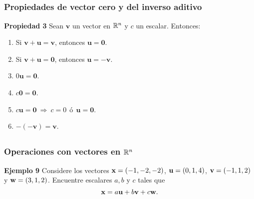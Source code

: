 
\subsection{}

\begin{frame}\frametitle{Propiedades de vector cero y del inverso aditivo}

\begin{prop}{\textbf{Propiedad 3}}
	\justifying
	Sean $\mathbf{v}$ un vector en $\mathbb{R}^n$ y $c$ un escalar. Entonces:
	\begin{enumerate}
		\item Si $\mathbf{v}+\mathbf{u}=\mathbf{v}$, entonces $\mathbf{u} = \mathbf{0}$.
		\item Si $\mathbf{v}+\mathbf{u}=\mathbf{0}$, entonces $\mathbf{u} = -\mathbf{v}$.
		\item $0\mathbf{u} = \mathbf{0}$.
		\item $c\mathbf{0} = \mathbf{0}$.
		\item $c\mathbf{u} = \mathbf{0} \ \Longrightarrow \ c=0 \ \ \text{ó} \ \ \mathbf{u} = \mathbf{0}$.
		\item $-(-\mathbf{v}) = \mathbf{v}$.
	\end{enumerate}
\end{prop}

\end{frame}


\subsection{}

\begin{frame}\frametitle{Operaciones con vectores en $\mathbb{R}^n$}

\begin{ej}{\textbf{Ejemplo 9}}\justifying
	Considere los vectores $\mathbf{x}=(-1,-2,-2)$, $\mathbf{u}=(0,1,4)$, $\mathbf{v}=(-1,1,2)$ y $\mathbf{w}=(3,1,2)$. 
	Encuentre escalares $a, b$ y $c$ tales que
	\[
		\mathbf{x} = a\mathbf{u} + b\mathbf{v} + c\mathbf{w}.
	\]	

\end{ej}

\end{frame}